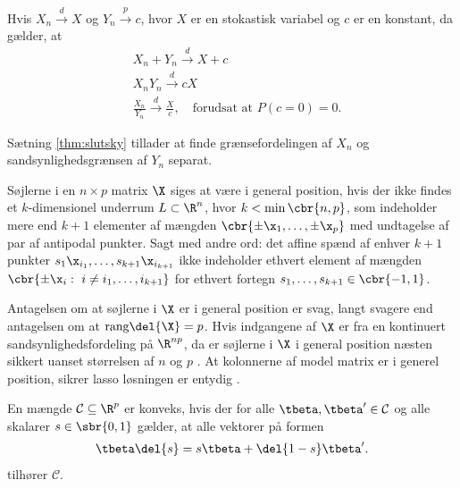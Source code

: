 \begin{thm} \label{thm:slutsky}
Hvis $X_n \overset{d}{\rightarrow} X$ og $Y_n \overset{p}{\rightarrow} c$, hvor $X$ er en stokastisk variabel og $c$ er en konstant, da gælder, at
\begin{align*}
& X_n + Y_n \overset{d}{\rightarrow} X+c \\
& X_n Y_n \overset{d}{\rightarrow} cX \\
& \frac{X_n}{Y_n} \overset{d}{\rightarrow} \frac{X}{c}, \quad \text{forudsat at } P(c=0)=0.
\end{align*}
\end{thm}
Sætning \ref{thm:slutsky} tillader at finde grænsefordelingen af $X_n$ og sandsynlighedsgrænsen af $Y_n$ separat.
%
\newpage
\begin{defn} \label{defn:general_position}
Søjlerne i en \(n \times p\) matrix \(\X\) siges at være i general position, hvis der ikke findes et  \(k\)-dimensionel underrum \(L \subset \R^n\), hvor \(k < \min \cbr{n,p}\), som indeholder mere end \(k+1\) elementer af mængden \(\cbr{\pm \x_1, \ldots, \pm \x_p}\) med undtagelse af par af antipodal punkter.
Sagt med andre ord: det affine spænd af enhver \(k+1\) punkter \(s_1 \x_{i_1}, \ldots, s_{k+1} \x_{i_{k+1}}\) ikke indeholder ethvert element af mængden \(\cbr{\pm \x_i : \ i \neq i_1, \ldots, i_{k+1}}\) for ethvert fortegn \(s_1, \ldots, s_{k+1} \in \cbr{-1,1}\).
\end{defn}
%
Antagelsen om at søjlerne i \(\X\) er i general position er svag, langt svagere end antagelsen om at \(\text{rang} \del{\X} = p\).
Hvis indgangene af \(\X\) er fra en kontinuert sandsynlighedsfordeling på \(\R^{np}\), da er søjlerne i \(\X\) i general position næsten sikkert uanset størrelsen af \(n\) og \(p\) \citep{lasso_unique}. 
At kolonnerne af model matrix er i generel position, sikrer lasso løsningen er entydig \citep{lasso_unique}.

\begin{defn} \label{defn:konveksm}
En mængde \(\mathcal{C} \subseteq \R^p\) er konveks, hvis der for alle \(\tbeta, \tbeta' \in \mathcal{C}\) og alle skalarer \(s \in \sbr{0,1}\) gælder, at alle vektorer på formen
\begin{align*}
\tbeta \del{s} = s \tbeta + \del{1-s} \tbeta'.
\end{align*}
tilhører \(\mathcal{C}\).
\end{defn}


